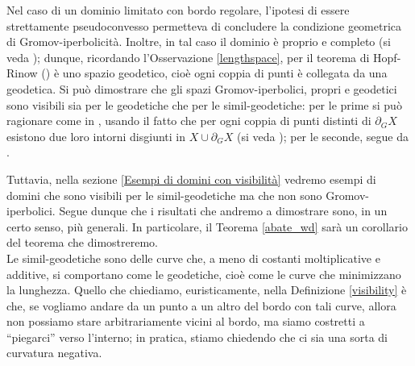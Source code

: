 \begin{oss} \label{spscvxisvis}
    Nel caso di un dominio limitato con bordo regolare, l'ipotesi di essere strettamente pseudoconvesso permetteva di concludere la condizione geometrica di Gromov-iperbolicità. Inoltre, in tal caso il dominio è proprio e completo (si veda \cite[Paragraph 3.3]{G}); dunque, ricordando l'Osservazione \ref{lengthspace}, per il teorema di Hopf-Rinow (\cite[Part I, Proposition 3.7]{BH}) è uno spazio geodetico, cioè ogni coppia di punti è collegata da una geodetica. Si può dimostrare che gli spazi Gromov-iperbolici, propri e geodetici sono visibili sia per le geodetiche che per le simil-geodetiche: per le prime si può ragionare come in \cite[Proposition 2.5]{BNT}, usando il fatto che per ogni coppia di punti distinti di $\partial_G X$ esistono due loro intorni disgiunti in $X\cup\partial_GX$ (si veda \cite[Part III, Chapter H, Lemma 3.6]{BH}); per le seconde, segue da \cite[Part III, Chapter H, Theorem 1.7]{BH}.
\end{oss}

Tuttavia, nella sezione \ref{Esempi di domini con visibilità} vedremo esempi di domini che sono visibili per le simil-geodetiche ma che non sono Gromov-iperbolici. Segue dunque che i risultati che andremo a dimostrare sono, in un certo senso, più generali. In particolare, il Teorema \ref{abate_wd} sarà un corollario del teorema che dimostreremo. \\

Le simil-geodetiche sono delle curve che, a meno di costanti moltiplicative e additive, si comportano come le geodetiche, cioè come le curve che minimizzano la lunghezza.
Quello che chiediamo, euristicamente, nella Definizione \ref{visibility} è che, se vogliamo andare da un punto a un altro del bordo con tali curve, allora non possiamo stare arbitrariamente vicini al bordo, ma siamo costretti a ``piegarci'' verso l'interno; in pratica, stiamo chiedendo che ci sia una sorta di curvatura negativa.

